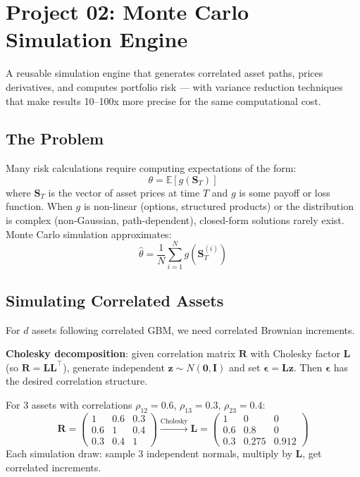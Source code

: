 \documentclass[11pt, a4paper]{article}
\newcommand{\EV}{\mathbb{E}}
\begin{document}
\section{Project 02: Monte Carlo Simulation Engine}

\begin{objective}
A reusable simulation engine that generates correlated asset paths, prices derivatives, and computes portfolio risk --- with variance reduction techniques that make results 10--100x more precise for the same computational cost.
\end{objective}

\subsection{The Problem}

Many risk calculations require computing expectations of the form:
\[
    \theta = \EV[g(\bm{S}_T)]
\]
where $\bm{S}_T$ is the vector of asset prices at time $T$ and $g$ is some payoff or loss function.
When $g$ is non-linear (options, structured products) or the distribution is complex (non-Gaussian, path-dependent), closed-form solutions rarely exist.
Monte Carlo simulation approximates:
\[
    \hat{\theta} = \frac{1}{N}\sum_{i=1}^{N} g(\bm{S}_T^{(i)})
\]

\subsection{Simulating Correlated Assets}

For $d$ assets following correlated GBM, we need correlated Brownian increments.

\begin{keyidea}
\textbf{Cholesky decomposition}: given correlation matrix $\bm{R}$ with Cholesky factor $\bm{L}$ (so $\bm{R} = \bm{L}\bm{L}^\top$), generate independent $\bm{z} \sim N(\bm{0}, \bm{I})$ and set $\bm{\epsilon} = \bm{L}\bm{z}$.
Then $\bm{\epsilon}$ has the desired correlation structure.

For 3 assets with correlations $\rho_{12} = 0.6$, $\rho_{13} = 0.3$, $\rho_{23} = 0.4$:
\[
\bm{R} = \begin{pmatrix} 1 & 0.6 & 0.3 \\ 0.6 & 1 & 0.4 \\ 0.3 & 0.4 & 1 \end{pmatrix}
\xrightarrow{\text{Cholesky}}
\bm{L} = \begin{pmatrix} 1 & 0 & 0 \\ 0.6 & 0.8 & 0 \\ 0.3 & 0.275 & 0.912 \end{pmatrix}
\]
Each simulation draw: sample 3 independent normals, multiply by $\bm{L}$, get correlated increments.
\end{keyidea}
\end{document}
